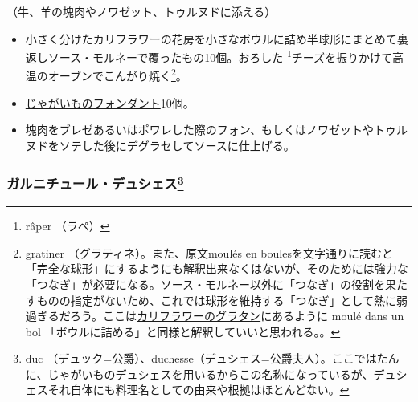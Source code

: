 \begin{recette}


（牛、羊の塊肉やノワゼット、トゥルヌドに添える）

\begin{itemize}
\item
  小さく分けたカリフラワーの花房を小さなボウルに詰め半球形にまとめて裏返し\protect\hyperlink{sauce-mornay}{ソース・モルネー}で覆ったもの10個。おろした
  \footnote{râper （ラペ）}チーズを振りかけて高温のオーブンでこんがり焼く\footnote{gratiner
    （グラティネ）。また、原文moulés en
    boulesを文字通りに読むと「完全な球形」にするようにも解釈出来なくはないが、そのためには強力な「つなぎ」が必要になる。ソース・モルネー以外に「つなぎ」の役割を果たすものの指定がないため、これでは球形を維持する「つなぎ」として熱に弱過ぎるだろう。ここは\protect\hyperlink{chou-fleur-au-gratin}{カリフラワーのグラタン}にあるように
    moulé dans un bol
    「ボウルに詰める」と同様と解釈していいと思われる。。}。
\item
  \protect\hyperlink{pommes-de-terre-fondantes}{じゃがいものフォンダント}10個。
\item
  塊肉をブレゼあるいはポワレした際のフォン、もしくはノワゼットやトゥルヌドをソテした後にデグラセしてソースに仕上げる。
\end{itemize}

\hypertarget{garniture-a-la-duchesse}{%
\subsubsection[ガルニチュール・デュシェス]{\texorpdfstring{ガルニチュール・デュシェス\footnote{duc
  （デュック=公爵）、duchesse（デュシェス=公爵夫人）。ここではたんに、\protect\hyperlink{pommes-de-terre-duchesse}{じゃがいものデュシェス}を用いるからこの名称になっているが、デュシェスそれ自体にも料理名としての由来や根拠はほとんどない。}}{ガルニチュール・デュシェス}}\label{garniture-a-la-duchesse}}




\end{recette}
